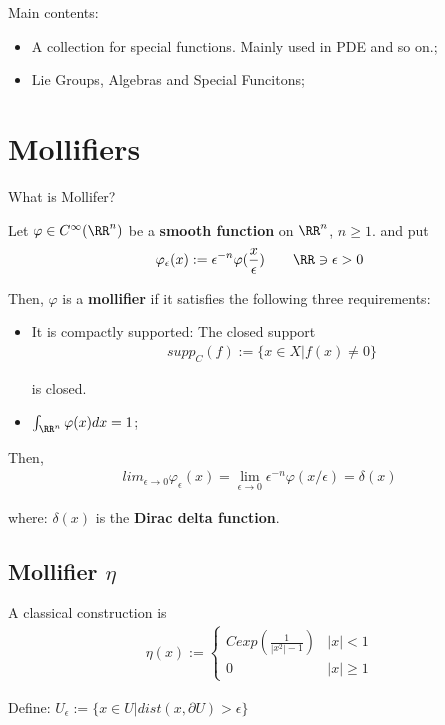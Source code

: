 \documentclass[Total.tex]{subfiles}
\begin{document}
	Main contents:
	\begin{itemize}
		\item A collection for special functions. Mainly used in PDE and so on.;
		\item Lie Groups, Algebras and Special Funcitons;
	\end{itemize}
		\chapter{Mollifiers}
			What is Mollifer?
			
			\begin{Def}
				Let $\varphi\in C^\infty(\RR^n)$ be a \textbf{smooth function} on $\RR^n$, $n\geq 1$. and put
				\begin{gather*}
					\varphi_\epsilon(x):=\epsilon^{-n}\varphi(\frac{x}{\epsilon})\qquad \RR\ni \epsilon>0
				\end{gather*}
				
				Then, $\varphi$ is a \textbf{mollifier} if it satisfies the following three requirements:
				\begin{itemize}
					\item It is compactly supported: The closed support 
					\begin{gather*}
						supp_C(f):=\{x\in X|f(x)\not=0\}
					\end{gather*} 
					
					is closed.  
					\item $\int_{\RR^n} \varphi(x)dx=1$;
				\end{itemize}
				
				Then,
				\begin{gather*}
					lim_{\epsilon\rightarrow 0}\varphi_\epsilon(x)=\lim_{\epsilon\rightarrow 0}\epsilon^{-n}\varphi(x/\epsilon)=\delta(x)
				\end{gather*}
				
				where: $\delta(x)$ is the \textbf{Dirac delta function}.
			\end{Def}
			
			
			\section{Mollifier $\eta$}
			
				\begin{Def}
					A classical construction is
					\begin{gather*}
						\eta(x):=\begin{cases}
							Cexp(\frac{1}{|x^2|-1})&|x|<1\\
							0&|x|\geq 1
						\end{cases}
					\end{gather*}
					
					Define: $U_\epsilon:=\{x\in U|dist(x,\partial U)>\epsilon\}$
				\end{Def}
				
\end{document}
